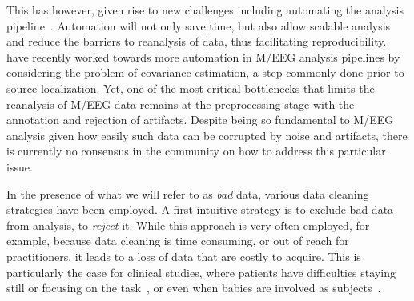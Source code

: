 This has however, given rise to new challenges including automating the analysis pipeline~\citep{gorgolewski2016practical}. Automation will not only save time, but also allow scalable analysis and reduce the barriers to reanalysis of data, thus facilitating reproducibility. \citet{engemann2015automated_new} have recently worked towards more automation in M/EEG analysis pipelines by considering the problem of covariance estimation, a step commonly done prior to source localization. Yet, one of the most critical bottlenecks that limits the reanalysis of M/EEG data remains at the preprocessing stage with the annotation and rejection of artifacts. Despite being so fundamental to M/EEG analysis given how easily such data can be corrupted by noise and artifacts, there is currently no consensus in the community on how to address this particular issue.

In the presence of what we will refer to as \emph{bad} data, various data cleaning strategies have been employed. A first intuitive strategy is to exclude bad data from analysis, to \emph{reject} it. While this approach is very often employed, for example, because data cleaning is time consuming, or out
of reach for practitioners, it leads to a loss of data that are costly to acquire. This is particularly the case for clinical studies, where patients have difficulties staying still or focusing on the task~\citep{cruse2012bedside,goldfine2013reanalysis}, or even when babies are involved as subjects~\citep{basirat2014hierarchy}.


